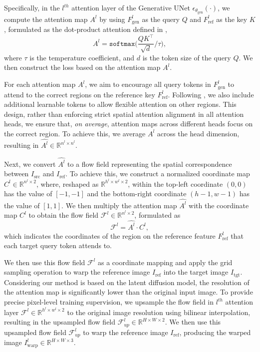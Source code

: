 Specifically, in the $l^{th}$ attention layer of the Generative UNet $\epsilon_{\theta_{\text{gen}}}(\cdot)$, we compute the attention map $A^{l}$ by using $F_{\text{gen}}^{l}$ as the query $Q$ and $F_{\text{ref}}^{l}$ as the key $K$, formulated as the dot-product attention defined in \citep{vaswani2017attention},
\begin{equation}
    A^{l} = \texttt{softmax} \bigg( \frac{Q K^{\top}}{\sqrt{d}} / \tau \bigg),
\end{equation}
where $\tau$ is the temperature coefficient, and $d$ is the token size of the query $Q$.
We then construct the \leffa{} loss based on the attention map $A^{l}$.

For each attention map $A^{l}$, we aim to encourage all query tokens in $F_{\text{gen}}^{l}$ to attend to the correct regions on the reference key $F_{\text{ref}}^{l}$.
Following \citet{darcet2023vision}, we also include additional learnable tokens to allow flexible attention on other regions.
This design, rather than enforcing strict spatial attention alignment in all attention heads, we ensure that, \textit{on average}, attention maps across different heads focus on the correct region.
To achieve this, we average $A^{l}$ across the head dimension, resulting in $\hat{A^{l}} \in \mathbb{R}^{n^{l} \times n^{l}}$.

Next, we convert $\hat{A^{l}}$ to a flow field representing the spatial correspondence between $I_\text{src}$ and $I_\text{ref}$.
To achieve this, we construct a normalized coordinate map $C^{l} \in \mathbb{R}^{n^{l} \times 2}$, where, reshaped as $\mathbb{R}^{h^{l} \times w^{l} \times 2}$, within the top-left coordinate $(0, 0)$ has the value of $[-1, -1]$ and the bottom-right coordinate $(h-1, w-1)$ has the value of $[1, 1]$.
We then multiply the attention map $\hat{A^{l}}$ with the coordinate map $C^{l}$ to obtain the flow field $\mathcal{F}^{l} \in \mathbb{R}^{n^{l} \times 2}$, formulated as
\begin{equation}
    \mathcal{F}^{l} = \hat{A^{l}} \cdot C^{l},
\end{equation}
which indicates the coordinates of the region on the reference feature $F_{\text{ref}}^{l}$ that each target query token attends to.

We then use this flow field $\mathcal{F}^{l}$ as a coordinate mapping and apply the grid sampling operation to warp the reference image $I_{\text{ref}}$ into the target image $I_{\text{tgt}}$.
Considering our method is based on the latent diffusion model, the resolution of the attention map is significantly lower than the original input image.
To provide precise pixel-level training supervision, we upsample the flow field in $l^{th}$ attention layer $\mathcal{F}^{l}\in\mathbb{R}^{h^{l} \times w^{l} \times 2}$ to the original image resolution using bilinear interpolation, resulting in the upsampled flow field $\mathcal{F}_{up}^{l} \in \mathbb{R}^{H \times W \times 2}$.
We then use this upsampled flow field $\mathcal{F}_{up}^{l}$ to warp the reference image $I_{\text{ref}}$, producing the warped image ${I_{\text{warp}}^{l}} \in \mathbb{R}^{H \times W \times 3}$.

